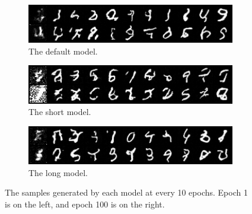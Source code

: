 \begin{figure}
\centering
\begin{subfigure}{0.8\textwidth}
    \centering
    \includegraphics[width=1\textwidth]{figures/q1b_samples_def}
    \caption{The default model.}
    \label{fig:q1b_samples_def}
\end{subfigure}%
\hfill
\begin{subfigure}{0.8\textwidth}
    \centering
    \includegraphics[width=1\textwidth]{./figures/q1b_samples_short}
    \caption{The short model.}
    \label{fig:q1b_samples_short}
\end{subfigure}
\hfill
\begin{subfigure}{0.8\textwidth}
    \centering
    \includegraphics[width=1\textwidth]{./figures/q1b_samples_long}
    \caption{The long model.}
    \label{fig:q1b_samples_long}
\end{subfigure}
\caption{The samples generated by each model at every 10 epochs. Epoch 1 is on the left, and epoch 100 is on the right.}
\label{fig:q1b_samples}
\end{figure}

